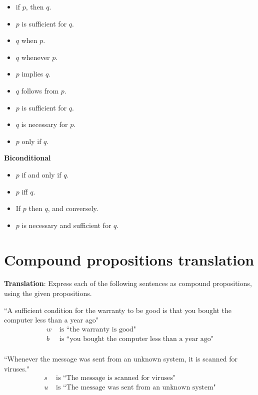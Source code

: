 \documentclass[12pt, oneside]{article}
\begin{document}
\begin{multicols}{2}
\begin{itemize}
    \item if $p$, then $q$.
    \item $p$ is sufficient for $q$.
    \item $q$ when $p$.
    \item $q$ whenever $p$.
    \item $p$ implies $q$.
    \item $q$ follows from $p$.
    \item $p$ is sufficient for $q$.
    \item $q$ is necessary for $p$.
    \item $p$ only if $q$.
\end{itemize}
\end{multicols}

{\bf Biconditional}

\vspace{-20pt}
\begin{itemize}
    \item $p$ if and only if $q$.
    \item $p$ iff $q$.
    \item If $p$ then $q$, and conversely.
    \item $p$ is necessary and sufficient for $q$.
\end{itemize} \vfill
\section*{Compound propositions translation}


{\bf Translation}: Express each of the following sentences as compound propositions, using
the given propositions.

\begin{multicols}{2}
``A sufficient condition for the warranty to be good is that you bought the computer less than a year ago"
\columnbreak
\begin{align*}
w &\text{ is  ``the warranty is good"} \\
b &\text{ is  ``you bought the computer less than a year ago"} \\
\end{align*}
\end{multicols}
\vfill

\begin{multicols}{2}
``Whenever the message was sent from an unknown system, it is scanned for viruses."
\columnbreak
\begin{align*}
s &\text{ is  ``The message is scanned for viruses"} \\
u &\text{ is  ``The message was sent from an unknown system"} \\
\end{align*}
\end{multicols}
\vfill
\end{document}
